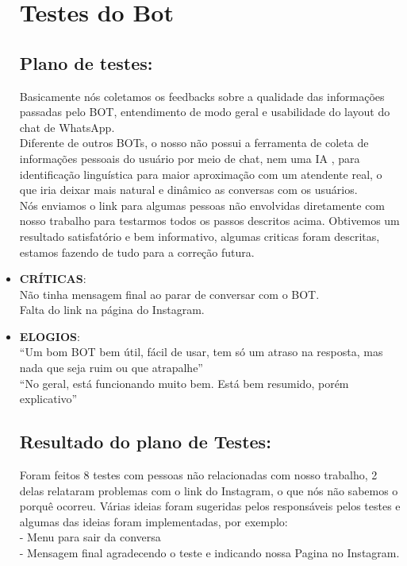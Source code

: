 \begin{itemize}
\section{Testes do Bot}
\subsection{Plano de testes:}

    Basicamente nós coletamos os feedbacks sobre a qualidade das informações passadas pelo BOT, entendimento de modo geral e usabilidade do layout do chat de WhatsApp.\\
	Diferente de outros BOTs, o nosso não possui a ferramenta de coleta de informações pessoais do usuário por meio de chat, nem uma IA \cite{ia}, para identificação linguística para maior aproximação com um atendente real, o que iria deixar mais natural e dinâmico as conversas com os usuários.\\
	Nós enviamos o link para algumas pessoas não envolvidas diretamente com nosso trabalho para testarmos todos os passos descritos acima. Obtivemos um resultado satisfatório e bem informativo, algumas criticas foram descritas, estamos fazendo de tudo para a correção futura.
\item \textbf{CRÍTICAS}: \\
Não tinha mensagem final ao parar de conversar com o BOT. \\
Falta do link na página do Instagram.\\
\item \textbf{ELOGIOS}: \\
“Um bom BOT bem útil, fácil de usar, tem só um atraso na resposta, mas nada que seja ruim ou que atrapalhe”\\
“No geral, está funcionando muito bem. Está bem resumido, porém explicativo”

\subsection{Resultado do plano de Testes:}

Foram feitos 8 testes com pessoas não relacionadas com nosso trabalho, 2 delas relataram problemas com o link do Instagram, o que nós não sabemos o porquê ocorreu. Várias ideias foram sugeridas pelos responsáveis pelos testes e algumas das ideias foram implementadas, por exemplo:\\
- Menu para sair da conversa\\
- Mensagem final agradecendo o teste e indicando nossa Pagina no Instagram. \\


\end{itemize}
